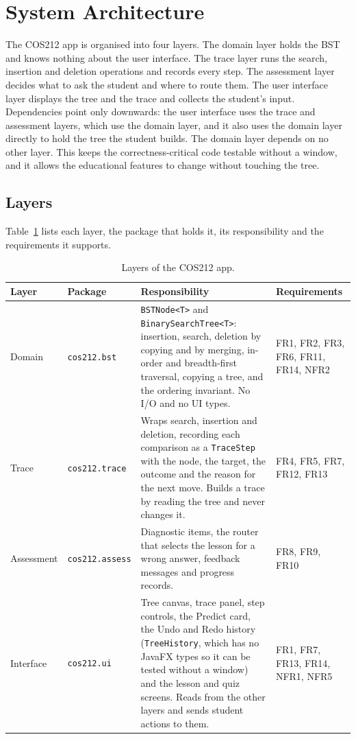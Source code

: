 \section{System Architecture}\label{sec:architecture}


The COS212 app is organised into four layers. The domain layer holds the BST and knows nothing about the user interface. The trace layer runs the search, insertion and deletion operations and records every step. The assessment layer decides what to ask the student and where to route them. The user interface layer displays the tree and the trace and collects the student's input. Dependencies point only downwards: the user interface uses the trace and assessment layers, which use the domain layer, and it also uses the domain layer directly to hold the tree the student builds. The domain layer depends on no other layer. This keeps the correctness-critical code testable without a window, and it allows the educational features to change without touching the tree.

\subsection{Layers}
Table~\ref{tab:layers} lists each layer, the package that holds it, its responsibility and the requirements it supports.

\begin{table}[H]
\centering
\small
\caption{Layers of the COS212 app.}
\label{tab:layers}
\begin{tabularx}{\textwidth}{l p{3.4cm} X p{2.4cm}}
\toprule
Layer & Package & Responsibility & Requirements \\
\midrule
Domain & \texttt{cos212.bst} & \texttt{BSTNode<T>} and \texttt{BinarySearchTree<T>}: insertion, search, deletion by copying and by merging, in-order and breadth-first traversal, copying a tree, and the ordering invariant. No I/O and no UI types. & FR1, FR2, FR3, FR6, FR11, FR14, NFR2 \\
Trace & \texttt{cos212.trace} & Wraps search, insertion and deletion, recording each comparison as a \texttt{TraceStep} with the node, the target, the outcome and the reason for the next move. Builds a trace by reading the tree and never changes it. & FR4, FR5, FR7, FR12, FR13 \\
Assessment & \texttt{cos212.assess} & Diagnostic items, the router that selects the lesson for a wrong answer, feedback messages and progress records. & FR8, FR9, FR10 \\
Interface & \texttt{cos212.ui} & Tree canvas, trace panel, step controls, the Predict card, the Undo and Redo history (\texttt{TreeHistory}, which has no JavaFX types so it can be tested without a window) and the lesson and quiz screens. Reads from the other layers and sends student actions to them. & FR1, FR7, FR13, FR14, NFR1, NFR5 \\
\bottomrule
\end{tabularx}
\end{table}

